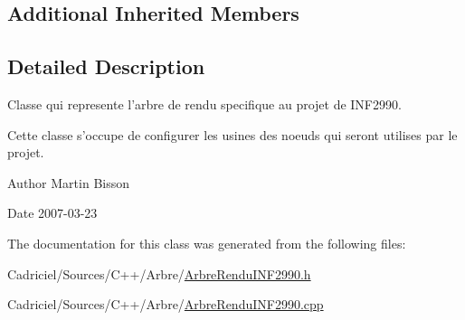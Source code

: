\subsection*{Additional Inherited Members}


\subsection{Detailed Description}
Classe qui represente l'arbre de rendu specifique au projet de I\-N\-F2990. 

Cette classe s'occupe de configurer les usines des noeuds qui seront utilises par le projet.

\begin{DoxyAuthor}{Author}
Martin Bisson 
\end{DoxyAuthor}
\begin{DoxyDate}{Date}
2007-\/03-\/23 
\end{DoxyDate}


The documentation for this class was generated from the following files\-:\begin{DoxyCompactItemize}
\item 
Cadriciel/\-Sources/\-C++/\-Arbre/\hyperlink{_arbre_rendu_i_n_f2990_8h}{Arbre\-Rendu\-I\-N\-F2990.\-h}\item 
Cadriciel/\-Sources/\-C++/\-Arbre/\hyperlink{_arbre_rendu_i_n_f2990_8cpp}{Arbre\-Rendu\-I\-N\-F2990.\-cpp}\end{DoxyCompactItemize}
